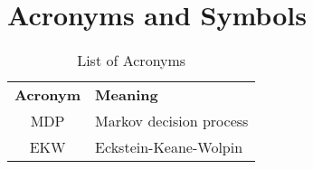 \section{Acronyms and Symbols}\label{List of Symbols}
\bgroup
\def\arraystretch{1.5}%
\tabulinesep=4.0mm
\begin{longtabu} to \textwidth{CL}
\caption{List of Acronyms}
\setlength\extrarowheight{0pt}\\ %
\bottomrule
\textbf{Acronym} & \textbf{Meaning} \\\midrule
\endhead
\bottomrule
\endfoot
MDP                 & Markov decision process \\
EKW                 & Eckstein-Keane-Wolpin
\end{longtabu}
\egroup
\newpage
\bgroup
\def\arraystretch{1.5}%
\tabulinesep=4.0mm

